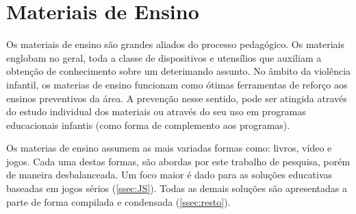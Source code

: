 










\section{Materiais de Ensino}\label{sec:materiais} \vspace{-0.2cm}

Os materiais de ensino são grandes aliados do processo pedagógico. Os materiais englobam no geral, toda a classe de dispositivos e utensílios que auxiliam a obtenção de conhecimento sobre um deterimando assunto. No âmbito da violência infantil, os materias de ensino funcionam como ótimas ferramentas de reforço aos ensinos preventivos da área. A prevenção nesse sentido, pode ser atingida através do estudo individual dos materiais ou através do seu uso em programas educacionais infantis (como forma de complemento aos programas).

Os materias de ensino assumem as mais variadas formas como: livros, vídeo e jogos. Cada uma destas formas, %
são abordas por este trabalho de pesquisa, porém de maneira desbalanceada. Um foco maior é dado para as soluções educativas baseadas em jogos sérios (\autoref{ssec:JS}). Todas as demais soluções são apresentadas a parte de forma compilada e condensada (\autoref{ssec:resto}). 



